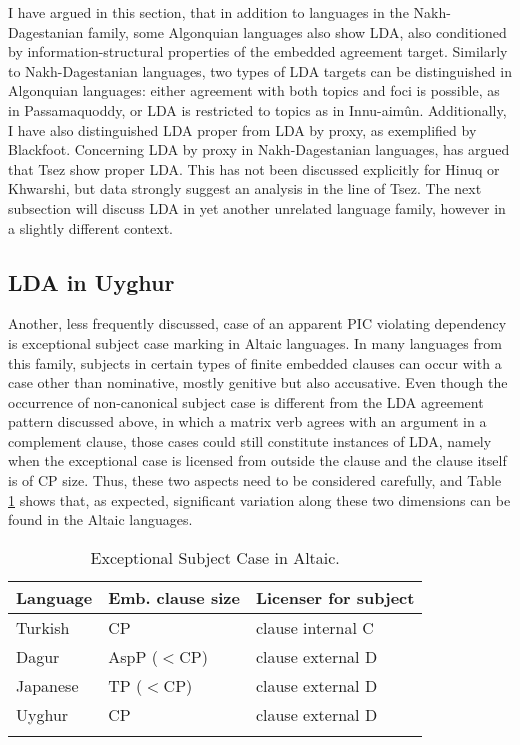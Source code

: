 \documentclass[output=paper
,modfonts
,nonflat]{langsci/langscibook}
\begin{document}
I have argued in this section, that in addition to languages in the Nakh-Da\-ges\-ta\-nian family, some Algonquian languages also show LDA, also conditioned by information-structural properties of the embedded agreement target. Similarly to Nakh-Dagestanian languages, two types of LDA targets can be distinguished in Algonquian languages: either agreement with both topics and foci is possible, as in Passamaquoddy, or LDA is restricted to topics as in Innu-aim\^{u}n. Additionally, I have also distinguished LDA proper from LDA by proxy, as exemplified by Blackfoot. Concerning LDA by proxy in Nakh-Dagestanian languages, \citet{Polinsky2003} has argued that Tsez show proper LDA. This has not been discussed explicitly for Hinuq or Khwarshi, but data strongly suggest an analysis in the line of Tsez. The next subsection will discuss LDA in yet another unrelated language family, however in a slightly different context.

\subsection{LDA in Uyghur}

Another, less frequently discussed, case of an apparent PIC violating dependency is exceptional subject case marking in Altaic languages. In many languages from this family, subjects in certain types of finite embedded clauses can occur with a case other than nominative, mostly genitive but also accusative. Even though the occurrence of non-canonical subject case is different from the LDA agreement pattern discussed above, in which a matrix verb agrees with an argument in a complement clause, those cases could still constitute instances of LDA, namely when the exceptional case is licensed from outside the clause and the clause itself is of CP size. Thus, these two aspects need to be considered carefully, and Table \ref{tab:exc_s_c} shows that, as expected, significant variation along these two dimensions can be found in the Altaic languages.
\begin{table}
\caption{Exceptional Subject Case in Altaic.}
\label{tab:exc_s_c}
 \begin{tabular}{lll} 
  \lsptoprule
  Language  & Emb. clause size & Licenser for subject\\
  \midrule
  Turkish \citep{Kornfilt2008} & CP & clause internal C\\
  Dagur \citep{Hale2002} & AspP ($ < $CP) & clause external D\\
  Japanese \citep{Miyagawa2011} & TP ($ < $CP) & clause external D\\
  Uyghur \citep{Asarina_Hartman2011a} & CP & clause external D\\
  \lspbottomrule
 \end{tabular}
\end{table}
\end{document}

